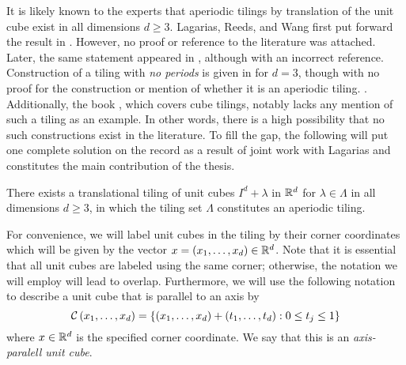 \documentclass[../thesis.tex]{subfiles}
\begin{document}

It is likely known to the experts that aperiodic tilings by translation of the unit cube exist in all dimensions $d\geq3$. Lagarias, Reeds, and Wang first put forward the result in \cite{lagariasOrthonormalBasesExponentials2000}. However, no proof or reference to the literature was attached. Later, the same statement appeared in \cite{liuUniformityNonUniformGabor2003}, although with an incorrect reference. Construction of a tiling with \emph{no periods} is given in \cite{kolountzakisStudyTranslationalTiling2003} for $d=3$, though with no proof for the construction or mention of whether it is an aperiodic tiling. . Additionally, the book \cite{zongCubeWindowConvex2006}, which covers cube tilings, notably lacks any mention of such a tiling as an example. In other words, there is a high possibility that no such constructions exist in the literature. To fill the gap, the following will put one complete solution on the record as a result of joint work with Lagarias \cite{haugeAperiodicTilingTranslations2023} and constitutes the main contribution of the thesis. 

\begin{theorem}
    There exists a translational tiling of unit cubes $I^d + \lambda$ in $\mathbb{R}^d$ for $\lambda\in \Lambda$ in all dimensions $d\geq3$, in which the tiling set $\Lambda$ constitutes an aperiodic tiling.
\end{theorem}

For convenience, we will label unit cubes in the tiling by their corner coordinates which will be given by the vector $x = (x_1,\dots,x_d) \in \mathbb{R}^d$. Note that it is essential that all unit cubes are labeled using the same corner; otherwise, the notation we will employ will lead to overlap. Furthermore, we will use the following notation to describe a unit cube that is parallel to an axis by
\begin{equation*}
    \mathcal{C}\left(x_1,\dots,x_d\right) = \left\{(x_1,\dots,x_d) + (t_1,\dots,t_d) : 0 \leq t_j \leq 1\right\}
\end{equation*} 
where $x\in \mathbb{R}^d$ is the specified corner coordinate. We say that this is an \emph{axis-paralell unit cube}. 
\end{document}
